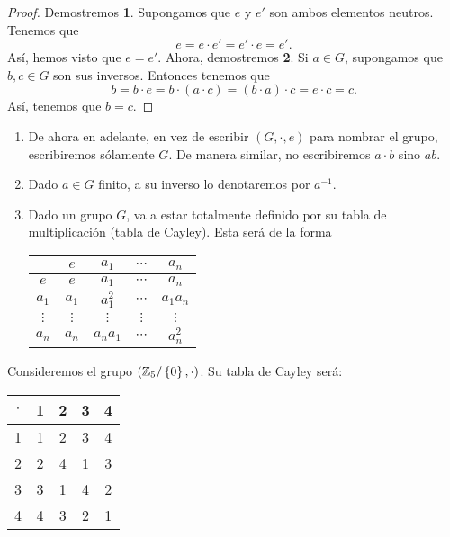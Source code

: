 \begin{proof}
Demostremos \textbf{1}. Supongamos que $\displaystyle e $ y $\displaystyle e' $ son ambos elementos neutros. Tenemos que 
\[e = e \cdot e' = e' \cdot e = e' .\]
Así, hemos visto que $\displaystyle e = e' $. Ahora, demostremos \textbf{2}. Si $\displaystyle a \in G $, supongamos que $\displaystyle b, c \in G $ son sus inversos. Entonces tenemos que
\[ b = b \cdot e = b \cdot (a \cdot c) = \left(b \cdot a \right) \cdot c = e \cdot c = c .\]
Así, tenemos que $\displaystyle b = c $.
\end{proof}
\begin{observation}
\begin{enumerate}
\item De ahora en adelante, en vez de escribir $\displaystyle \left(G, \cdot , e\right) $ para nombrar el grupo, escribiremos sólamente $\displaystyle G $. De manera similar, no escribiremos $\displaystyle a \cdot b $ sino $\displaystyle ab $.
\item Dado $\displaystyle a \in G $ finito, a su inverso lo denotaremos por $\displaystyle a^{-1} $.
\item Dado un grupo $\displaystyle G $, va a estar totalmente definido por su tabla de multiplicación (tabla de Cayley). Esta será de la forma
	\begin{center}
	\begin{tabular}{c | c | c | c | c}
	& $\displaystyle e $  & $\displaystyle a_{1} $ & $\displaystyle \cdots $ & $\displaystyle a_{n} $ \\
	\hline 
		$\displaystyle e $ & $\displaystyle e $ & $\displaystyle a_{1} $ & $\displaystyle \cdots  $ & $\displaystyle a_{n} $ \\
		\hline
		$\displaystyle a_{1} $ & $\displaystyle a_{1} $ & $\displaystyle a_{1}^{2} $ & $\displaystyle \cdots  $ & $\displaystyle a_{1} a_{n} $ \\
		\hline
		$\displaystyle \vdots  $ & $\displaystyle \vdots $  & $\displaystyle \vdots $  & $\displaystyle \vdots $ & $\displaystyle \vdots $ \\
		\hline 
		$\displaystyle a_{n} $ & $\displaystyle a_{n} $ & $\displaystyle a_{n}a_{1} $ & $\displaystyle \cdots  $ & $\displaystyle a_{n}^{2} $ 
	\end{tabular}
	\end{center}
\end{enumerate}
\end{observation}
\begin{eg}
	Consideremos el grupo $\displaystyle \left(\mathbb{Z}_{5} / \left\{ 0\right\} , \cdot\right) $. Su tabla de Cayley será:
\begin{center}
\begin{tabular}{c|c|c|c|c}
$\displaystyle \cdot $ & 1 & 2 & 3 & 4 \\
\hline
	1 & 1 & 2 & 3 & 4 \\
\hline 
	2 & 2 & 4 & 1 & 3 \\
\hline 
	3 & 3 & 1 & 4 & 2 \\
\hline 
	4 & 4 & 3 & 2 & 1
\end{tabular}
\end{center}
\end{eg}
